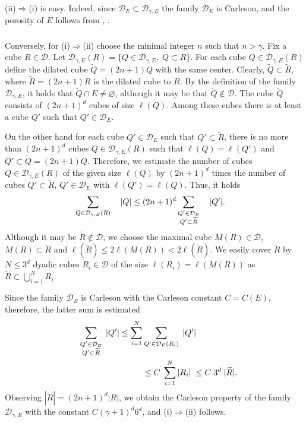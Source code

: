 \documentclass[12pt]{amsart} \setlength{\textwidth}{15cm} \setlength{\textheight}{24cm} \setlength{\voffset}{-1cm} \setlength{\oddsidemargin}{-0.4cm} \setlength{\evensidemargin}{-0.4cm}
\theoremstyle{definition}
\theoremstyle{remark}
\begin{document}
 \subsubsection{}
  (ii)$\Rightarrow$(i) is easy. Indeed, since  $ \mathcal{D}_{ E} \subset \mathcal{D}_{\gamma, E}$ the family $\mathcal{D}_{ E}$ is Carleson, and the porosity of $E$ follows from \cite{BNT}, \cite{V}.

 \subsubsection{} Conversely, for (i)$\Rightarrow$(ii)
choose   the minimal integer $n$ such that
$n > \gamma$.
Fix a cube $R \in \mathcal{D}$. Let $\mathcal{D}_{\gamma, E}(R) = \{Q \in \mathcal{D}_{\gamma, E},\;
 Q \subset R \}$.
   For each cube $Q \in \mathcal{D}_{\gamma, E}(R)$
 define the dilated cube $\widetilde{Q}=  (2n+1) Q$ with the same center. Clearly, $\widetilde{Q} \subset  \widetilde{R}$, where  $\widetilde{R} =(2n+1) R $ is the dilated cube to $R$. By the definition of the family $\mathcal{D}_{\gamma, E}$, it holds that $\widetilde{Q} \cap E \neq \varnothing$, although it may be that  $\widetilde{Q} \notin  \mathcal{D}$.  The cube $\widetilde{Q}$ consists of $(2n+1)^d$ cubes of size $\ell(Q)$.
Among these cubes there is  at least  a cube $Q'$ such that $Q' \in \mathcal{D}_E$.

 On the other hand for each cube $Q'\in \mathcal{D}_E$ such that $Q'  \subset  \widetilde{R} $, there is no more than $(2n+1)^d$ cubes $Q \in \mathcal{D}_{\gamma, E}(R)$ such that $\ell(Q)=\ell(Q')$ and  $Q' \subset \widetilde{Q}=(2n+1) Q $. Therefore, we estimate the number of cubes
 $Q \in \mathcal{D}_{\gamma, E}(R)$ of the given size $\ell(Q)$ by $(2n+1)^d$ times the number of cubes
 $Q' \subset \widetilde{R} $,  $Q' \in \mathcal{D}_E$ with $\ell(Q')=\ell(Q)$.  Thus, it holds
\[
 \aligned
\sum_{Q \in
\mathcal{D}_{\gamma, E}(R)} \quad |Q|
  &\leq (2n+1)^d \sum_{ \substack {Q' \in\mathcal{D}_{ E}\\
  Q' \subset\widetilde{R}}} \quad|Q'|.
           \endaligned
  \]
  Although it may be  $\widetilde{R} \notin \mathcal{D} $, we choose the maximal cube $M(R) \in \mathcal{D}$,  $M(R) \subset \widetilde{R}$ and $ \ell(\widetilde{R})\leq 2 \ell(M(R)) < 2\ell(\widetilde{R}) $.   We easily cover $\widetilde{R}$  by  $N \leq 3^d$ dyadic cubes
  $R_i \in \mathcal{D} $  of the size $ \ell(R_i) = \ell(M(R)) $ as
 $\widetilde{R} \subset \bigcup_{i=1}^{N} R_i $.

   Since  \cite[Theorem 7]{V} the family $\mathcal{D}_{ E}$  is Carleson with   the  Carleson constant $C=C(E)$, therefore, the latter sum is estimated
  \[
 \aligned
  \quad  \sum_{ \substack {Q' \in\mathcal{D}_{ E}\\
  Q' \subset\widetilde{R}} } \;|Q'|
   \leq  \sum_{i=1} ^{N} &\sum_ {Q' \in\mathcal{D}_E( R_i)}  \;|Q'|\\
    &\leq C\;  \sum_{i=1} ^{N}|R_i| \;\leq C\; 3^d \; |\widetilde{R}|.
        \endaligned
     \]
 Observing  $|\widetilde{R}| =  (2n+1)^d |R|$, we  obtain
   the Carleson property of
the family $\mathcal{D}_{\gamma, E}$ with the constant $C(\gamma +1)^{d}6^d$, and (i)$\Rightarrow$(ii) follows.
\end{document}
